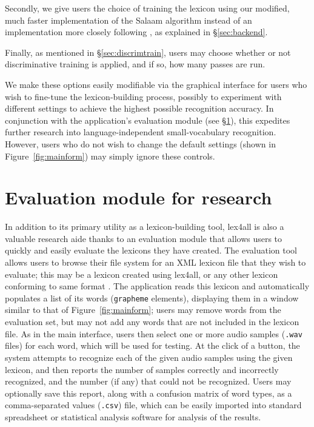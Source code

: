 \documentclass[11pt]{article}
\begin{document}
Secondly, we give users the choice of training the lexicon using our modified, much faster implementation of the Salaam algorithm instead of an implementation more closely following , as explained in \S\ref{sec:backend}.

Finally, as mentioned in \S\ref{sec:discrimtrain}, users may choose whether or not discriminative training 
is applied, and if so, how many passes are run.

We make these options easily modifiable via the graphical interface for users who wish to fine-tune the lexicon-building process, possibly to experiment with different settings to achieve the highest possible recognition accuracy. In conjunction with the application's evaluation module (see \S\ref{sec:evaluation}), this expedites further research into language-independent small-vocabulary recognition. However, users who do not wish to change the default settings (shown in Figure~\ref{fig:mainform}) may simply ignore these controls.



\section{Evaluation module for research}
\label{sec:evaluation}

In addition to its primary utility as a lexicon-building tool, lex4all is also a valuable research aide thanks to an evaluation module that allows users to quickly and easily evaluate the lexicons they have created. The evaluation tool allows users to browse their file system for an XML lexicon file that they wish to evaluate; this may be a lexicon created using lex4all, or any other lexicon conforming to same format \cite{pls}. The application reads this lexicon and automatically populates a list of its words (\texttt{grapheme} elements), displaying them in a window similar to that of Figure~\ref{fig:mainform}; users may remove words from the evaluation set, but may not add any words that are not included in the lexicon file. As in the main interface, users then select one or more audio samples (\texttt{.wav} files) for each word, which will be used for testing. At the click of a button, the system attempts to recognize each of the given audio samples using the given lexicon, and then reports the number of samples correctly and incorrectly recognized, and the number (if any) that could not be recognized. Users may optionally save this report, along with a confusion matrix of word types, as a comma-separated values (\texttt{.csv}) file, which can be easily imported into standard spreadsheet or statistical analysis software for analysis of the results. 
\end{document}
